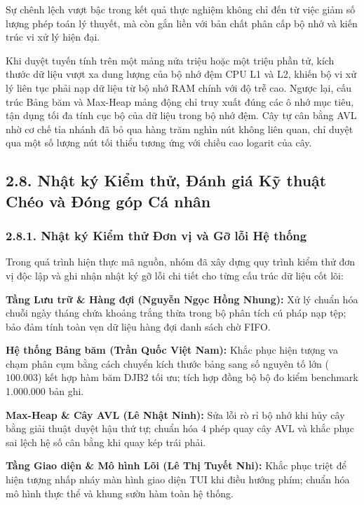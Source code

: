 \documentclass[14pt,a4paper]{extarticle}
\begin{document}
Sự chênh lệch vượt bậc trong kết quả thực nghiệm không chỉ đến từ việc giảm số lượng phép toán lý thuyết, mà còn gắn liền với bản chất phân cấp bộ nhớ và kiến trúc vi xử lý hiện đại.

Khi duyệt tuyến tính trên một mảng nửa triệu hoặc một triệu phần tử, kích thước dữ liệu vượt xa dung lượng của bộ nhớ đệm CPU L1 và L2, khiến bộ vi xử lý liên tục phải nạp dữ liệu từ bộ nhớ RAM chính với độ trễ cao. Ngược lại, cấu trúc Bảng băm và Max-Heap mảng động chỉ truy xuất đúng các ô nhớ mục tiêu, tận dụng tối đa tính cục bộ của dữ liệu trong bộ nhớ đệm. Cây tự cân bằng AVL nhờ cơ chế tỉa nhánh đã bỏ qua hàng trăm nghìn nút không liên quan, chỉ duyệt qua một số lượng nút tối thiểu tương ứng với chiều cao logarit của cây.

\subsection*{2.8. Nhật ký Kiểm thử, Đánh giá Kỹ thuật Chéo và Đóng góp Cá nhân}

\subsubsection*{2.8.1. Nhật ký Kiểm thử Đơn vị và Gỡ lỗi Hệ thống}

Trong quá trình hiện thực mã nguồn, nhóm đã xây dựng quy trình kiểm thử đơn vị độc lập và ghi nhận nhật ký gỡ lỗi chi tiết cho từng cấu trúc dữ liệu cốt lõi:

\textbf{Tầng Lưu trữ \& Hàng đợi (Nguyễn Ngọc Hồng Nhung):} Xử lý chuẩn hóa chuỗi ngày tháng chứa khoảng trắng thừa trong bộ phân tích cú pháp nạp tệp; bảo đảm tính toàn vẹn dữ liệu hàng đợi danh sách chờ FIFO.

\textbf{Hệ thống Bảng băm (Trần Quốc Việt Nam):} Khắc phục hiện tượng va chạm phân cụm bằng cách chuyển kích thước bảng sang số nguyên tố lớn ($100.003$) kết hợp hàm băm DJB2 tối ưu; tích hợp đồng bộ bộ đo kiểm benchmark 1.000.000 bản ghi.

\textbf{Max-Heap \& Cây AVL (Lê Nhật Ninh):} Sửa lỗi rò rỉ bộ nhớ khi hủy cây bằng giải thuật duyệt hậu thứ tự; chuẩn hóa 4 phép quay cây AVL và khắc phục sai lệch hệ số cân bằng khi quay kép trái phải.

\textbf{Tầng Giao diện \& Mô hình Lõi (Lê Thị Tuyết Nhi):} Khắc phục triệt để hiện tượng nhấp nháy màn hình giao diện TUI khi điều hướng phím; chuẩn hóa mô hình thực thể và khung sườn hàm toàn hệ thống.
\end{document}
